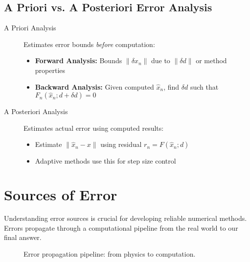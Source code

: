 \subsection{A Priori vs. A Posteriori Error Analysis}
\label{subsec:error-analysis-types}

\begin{description}
    \item[A Priori Analysis] Estimates error bounds \emph{before} computation:
          \begin{itemize}
              \item \textbf{Forward Analysis:} Bounds $\|\delta x_n\|$ due to $\|\delta d\|$ or method properties
              \item \textbf{Backward Analysis:} Given computed $\hat{x}_n$, find $\delta d$ such that $F_n(\hat{x}_n; d + \delta d) = 0$
          \end{itemize}

    \item[A Posteriori Analysis] Estimates actual error using computed results:
          \begin{itemize}
              \item Estimate $\|\hat{x}_n - x\|$ using residual $r_n = F(\hat{x}_n; d)$
              \item Adaptive methods use this for step size control
          \end{itemize}
\end{description}

\section{Sources of Error}
\label{sec:sources}

Understanding error sources is crucial for developing reliable numerical methods. Errors propagate through a computational pipeline from the real world to our final answer.

\begin{figure}[ht]
    \centering
    \caption{Error propagation pipeline: from physics to computation.}
    \label{fig:error-pipeline}
\end{figure}

